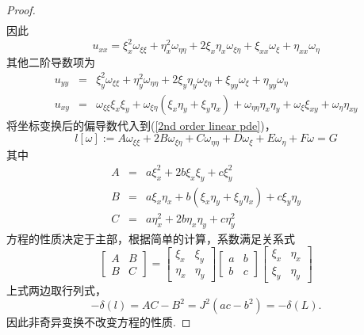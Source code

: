 \begin{proof}
\begin{eqnarray}
		\end{eqnarray}
		因此
		\begin{equation}
			u_{xx}=\xi_x^2 \omega_{\xi\xi} + \eta_x^2 \omega_{\eta\eta} + 2\xi_x\eta_x\omega_{\xi\eta} + \xi_{xx}\omega_{\xi} + \eta_{xx}\omega_{\eta}
		\end{equation}
		其他二阶导数项为
		\begin{eqnarray}
			u_{yy} & = & \xi_y^2 \omega_{\xi\xi} + \eta_y^2 \omega_{\eta\eta} + 2\xi_y\eta_y\omega_{\xi\eta} + \xi_{yy}\omega_{\xi} + \eta_{yy}\omega_{\eta} \\
			u_{xy} & = & \omega_{\xi\xi}\xi_x\xi_y + \omega_{\xi\eta}(\xi_x\eta_y+\xi_y\eta_x) + \omega_{\eta\eta}\eta_x\eta_y + \omega_{\xi}\xi_{xy} + \omega_{\eta}\eta_{xy}
		\end{eqnarray}
		将坐标变换后的偏导数代入到(\ref{2nd order linear pde})，
		\begin{equation}
			l[\omega]:=A\omega_{\xi\xi}+2B\omega_{\xi\eta} + C\omega_{\eta\eta} + D\omega_{\xi} + E\omega_{\eta} + F\omega = G
		\end{equation}
		其中
		\begin{eqnarray}
			A & = & a\xi_x^2 + 2b\xi_x\xi_y + c\xi_y^2 \\
			B & = & a\xi_x\eta_x + b(\xi_x\eta_y+\xi_y\eta_x) + c\xi_y \eta_y \\
			C & = & a\eta_x^2 + 2b\eta_x\eta_y + c\eta_y^2
		\end{eqnarray}
		方程的性质决定于主部，根据简单的计算，系数满足关系式
		\begin{equation}
			\begin{bmatrix}
				A & B \\
				B & C
			\end{bmatrix} = 
			\begin{bmatrix}
				\xi_x & \xi_y \\
				\eta_x & \eta_y
			\end{bmatrix} 
			\begin{bmatrix}
				a & b \\
				b & c 
			\end{bmatrix}
			\begin{bmatrix}
				\xi_x & \eta_x \\
				\xi_y & \eta_y
			\end{bmatrix}
		\end{equation}
	上式两边取行列式，
	\begin{equation}
		-\delta(l)=AC - B^2 = J^2(ac - b^2) = -\delta(L).
	\end{equation}
	因此非奇异变换不改变方程的性质.
	
	\end{proof}
